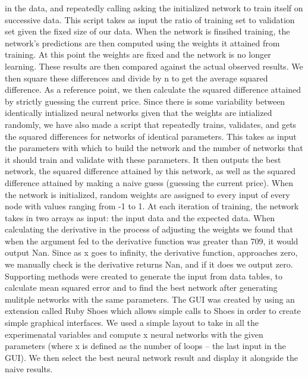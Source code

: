 \documentclass[a4paper,11pt]{article}
\begin{document}
in the data, and repeatedly calling asking the initialized network to train itself on successive data.  This script takes
as input the ratio of training set to validation set given the fixed size of our data.  When the network is finsihed training,
the network's predictions are then computed using the weights it attained from training.  At this point the weights are fixed
and the network is no longer learning.  These results are then compared against the actual observed results.  We then square these
differences and divide by n to get the average squared difference.  As a reference point, we then calculate the squared difference
attained by strictly guessing the current price.  
\newline \newline
Since there is some variability between identically intialized neural networks given that the weights are intialized randomly, 
we have also made a script that repeatedly trains, validates, and gets the squared differences for networks of identical 
parameters.  This takes as input the parameters with which to build the network and the number of networks that it should
train and validate with these parameters.  It then outputs the best network, the squared difference attained by this network,
as well as the squared difference attained by making a naive guess (guessing the current price).
\newline \newline
When the network is initialized, random weights are assigned to every input of every node with values ranging from -1 to 1.
At each iteration of training, the network takes in two arrays as input: the input data and the expected data.  When calculating
the derivative in the process of adjusting the weights we found that when the argument fed to the derivative function was
greater than 709, it would output Nan.  Since as x goes to infinity, the derivative function, approaches zero, we manually
check is the derivative returns Nan, and if it does we output zero.
\newline
Supporting methods were created to generate the input from data tables, to calculate mean squared error and to find the best network after generating mulitple networks with the same parameters.
\newline
The GUI was created by using an extension called Ruby Shoes which allows simple calls to Shoes in order to create simple graphical interfaces. We used a simple layout to take in all the experimenatal variables and compute x neural networks with the given parameters (where x is defined as the number of loops -- the last input in the GUI). We then select the best neural network result and display it alongside the naive results. 
\end{document}
